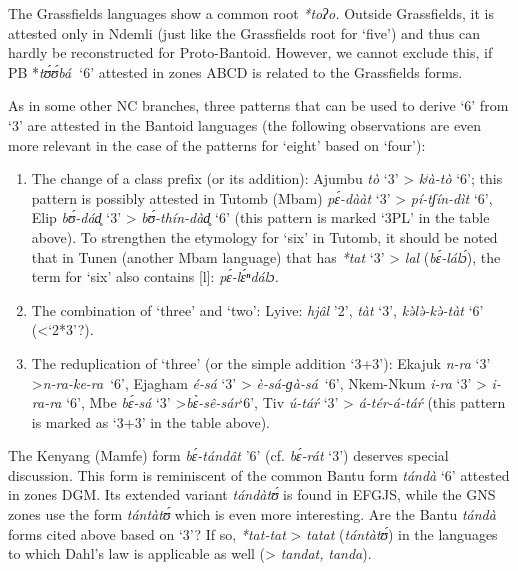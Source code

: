 The Grassfields languages show a common root \textit{*toʔo.} Outside Grassfields, it is attested only in Ndemli (just like the Grassfields root for `five') and thus can hardly be reconstructed for Proto-Bantoid. However, we cannot exclude this, if PB *\textit{t{\'{ʊ}}{\'{ʊ}}bá}\textbf{~}‘6’ attested in zones ABCD is related to the Grassfields forms.

As in some other NC branches, three patterns that can be used to derive `6' from `3' are attested in the Bantoid languages (the following observations are even more relevant in the case of the patterns for `eight' based on `four'):

\begin{enumerate}
\item The change of a class prefix (or its addition): Ajumbu \textit{tò} ‘3’ > \textit{kʲà-tò} ‘6’; this pattern is possibly attested in Tutomb (Mbam) \textit{p{\'{ɛ}}-dààt} ‘3’ > \textit{pí-tʃín-dìt} ‘6’, Elip \textit{b{\'{ʊ}}-dád̥} ‘3’ > \textit{b{\'{ʊ}}-thín-dàd̥} ‘6’ (this pattern is marked ‘3PL’ in the table above). To strengthen the etymology for `six' in Tutomb, it should be noted that in Tunen (another Mbam language) that has \textit{*tat} ‘3’ > \textit{lal} (\textit{b{\'{ɛ}}-lál{\'{ɔ}}}), the term for `six' also contains [l]: \textit{p{\'{ɛ}}-l{\'{ɛ}}ⁿdálɔ.}
\item The combination of `three' and `two': Lyive: \textit{hj{\^{a}}l} ’2’, \textit{tàt} ‘3’, \textit{k{\`{ə}}l{\`{ə}}-k{\`{ə}}-tàt} ‘6’ (<‘2*3’?).
\item The reduplication of `three' (or the simple addition ‘3+3’): Ekajuk \textit{n-ra} ‘3’ >\textit{n-ra-ke-ra}~‘6’, Ejagham \textit{é-sá} ‘3’ > \textit{è-sá-ɡà-sá}~‘6’, Nkem-Nkum \textit{i-ra} ‘3’ > \textit{i-ra-ra} ‘6’, Mbe \textit{b{\'{ɛ}}-sá} ‘3’ >\textit{b{\`{ɛ}}-s{\^{e}}-sár}‘6’, Tiv \textit{{\'{u}}-tá{\'{r}}} ‘3’ > \textit{á-tér-á-tá{\'{r}}} (this pattern is marked as ‘3+3’ in the table above). 
\end{enumerate}
The Kenyang (Mamfe) form \textit{b{\'{ɛ}}-tánd{\^{a}}t} ’6’ (cf. \textit{b{\'{ɛ}}-rát} ‘3’) deserves special discussion. This form is reminiscent of the common Bantu form \textit{tándà} ‘6’ attested in zones DGM. Its extended variant \textit{tándàt{\'{ʊ}}} is found in EFGJS, while the GNS zones use the form \textit{tántàt{\'{ʊ}}} which is even more interesting. Are the Bantu \textit{tándà} forms cited above based on `3'?  If so, \textit{*tat-tat} > \textit{tatat} (\textit{tántàt{\'{ʊ}}}) in the languages to which Dahl's law is applicable as well (> \textit{tandat,} \textit{tanda}).

